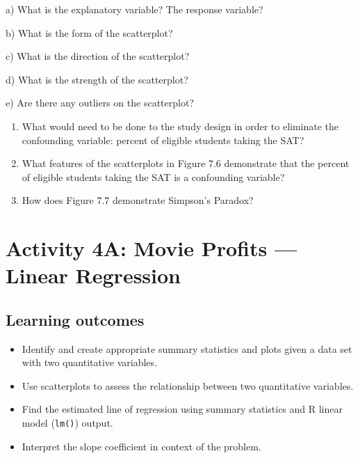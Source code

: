 \documentclass[
]{report}
\newcommand{\rgs}{\vspace{12pt}} %
\newcommand{\rgi}{\hspace{24pt}}  %
\begin{document}
\rgi a) What is the explanatory variable? The response variable?
\rgs

\rgi b) What is the form of the scatterplot?
\rgs

\rgi c) What is the direction of the scatterplot?
\rgs

\rgi d) What is the strength of the scatterplot?
\rgs

\rgi e) Are there any outliers on the scatterplot?
\rgs

\begin{enumerate}
\def\labelenumi{\arabic{enumi}.}
\setcounter{enumi}{2}
\item
  What would need to be done to the study design in order to eliminate the confounding variable: percent of eligible students taking the SAT?
  \rgs
\item
  What features of the scatterplots in Figure 7.6 demonstrate that the percent of eligible students taking the SAT is a confounding variable?
  \rgs
\item
  How does Figure 7.7 demonstrate Simpson's Paradox?
  \rgs
\end{enumerate}

\newpage

\hypertarget{activity-4a-movie-profits-linear-regression}{%
\section{Activity 4A: Movie Profits --- Linear Regression}\label{activity-4a-movie-profits-linear-regression}}


\hypertarget{learning-outcomes-6}{%
\subsection{Learning outcomes}\label{learning-outcomes-6}}

\begin{itemize}
\item
  Identify and create appropriate summary statistics and plots
  given a data set with two quantitative variables.
\item
  Use scatterplots to assess the relationship between two quantitative variables.
\item
  Find the estimated line of regression using summary statistics and R linear model (\texttt{lm()}) output.
\item
  Interpret the slope coefficient in context of the problem.
\end{itemize}
\end{document}
